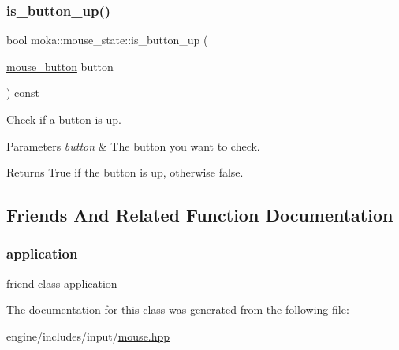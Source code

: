 \subsubsection{\texorpdfstring{is\_button\_up()}{is\_button\_up()}}
{\footnotesize\ttfamily bool moka\+::mouse\+\_\+state\+::is\+\_\+button\+\_\+up (\begin{DoxyParamCaption}\item[{\mbox{\hyperlink{namespacemoka_a6abad6bcde3e62228759441d067533a0}{mouse\+\_\+button}}}]{button }\end{DoxyParamCaption}) const}



Check if a button is up. 


\begin{DoxyParams}{Parameters}
{\em button} & The button you want to check. \\
\hline
\end{DoxyParams}
\begin{DoxyReturn}{Returns}
True if the button is up, otherwise false. 
\end{DoxyReturn}


\subsection{Friends And Related Function Documentation}
\mbox{\label{classmoka_1_1mouse__state_a5b97104505447c42689b96b15027d832}} 
\subsubsection{\texorpdfstring{application}{application}}
{\footnotesize\ttfamily friend class \mbox{\hyperlink{classmoka_1_1application}{application}}\hspace{0.3cm}{\ttfamily [friend]}}



The documentation for this class was generated from the following file\+:\begin{DoxyCompactItemize}
\item 
engine/includes/input/\mbox{\hyperlink{mouse_8hpp}{mouse.\+hpp}}\end{DoxyCompactItemize}

